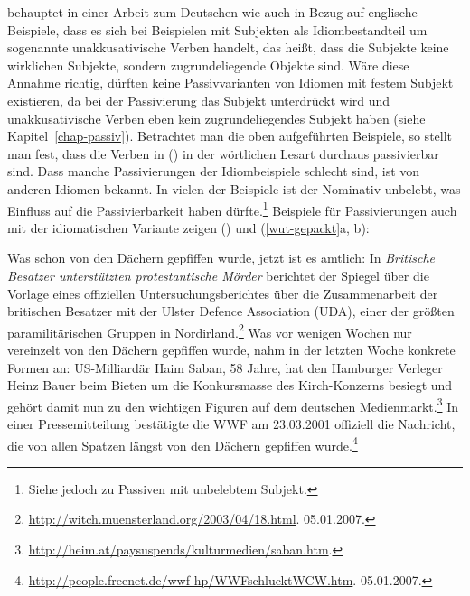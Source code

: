 \citet[]{Scherpenisse86a} behauptet in einer Arbeit zum Deutschen wie auch \citet{Marantz84a}
in Bezug auf englische Beispiele,
dass es sich bei Beispielen mit Subjekten als Idiombestandteil um sogenannte unakkusativische Verben
handelt, das heißt, dass die Subjekte keine wirklichen Subjekte,
sondern zugrundeliegende Objekte sind. 
%
Wäre diese Annahme richtig,
dürften keine Passivvarianten von Idiomen mit festem Subjekt existieren,
da bei der Passivierung das Subjekt unterdrückt wird und unakkusativische
Verben eben kein zugrundeliegendes Subjekt haben (siehe Kapitel~\ref{chap-passiv}).
Betrachtet man die oben aufgeführten Beispiele, so stellt man fest, dass die Verben in
() in der wörtlichen Lesart durchaus passivierbar sind.
Dass manche Passivierungen der Idiombeispiele schlecht sind, ist
von anderen Idiomen bekannt. In vielen der Beispiele ist der Nominativ
unbelebt, was Einfluss auf die Passivierbarkeit haben dürfte.\footnote{
        Siehe jedoch  zu Passiven mit
        unbelebtem Subjekt.%
}
Beispiele für Passivierungen auch mit der idiomatischen Variante zeigen () %
und (\ref{wut-gepackt}a, b):

\eal
\ex Was schon von den Dächern gepfiffen wurde, jetzt ist es amtlich: In \emph{Britische Besatzer unterstützten protestantische Mörder} berichtet der Spiegel über die Vorlage eines offiziellen Untersuchungsberichtes über die Zusammenarbeit der britischen Besatzer mit der Ulster Defence Association (UDA), einer der größten paramilitärischen Gruppen in Nordirland.\footnote{
  \url{http://witch.muensterland.org/2003/04/18.html}. 05.01.2007.
}
\ex Was vor wenigen Wochen nur vereinzelt von den Dächern gepfiffen wurde, nahm in der letzten Woche konkrete Formen an: US-Milliardär Haim Saban, 58 Jahre, hat den Hamburger Verleger Heinz Bauer beim Bieten um die Konkursmasse des Kirch-Konzerns besiegt und gehört damit nun zu den wichtigen Figuren auf dem deutschen Medienmarkt.\footnote{
  \url{http://heim.at/paysuspends/kulturmedien/saban.htm}.
}
\ex In einer Pressemitteilung bestätigte die WWF am 23.03.2001 offiziell die Nachricht, die von allen Spatzen längst von den Dächern gepfiffen wurde.\footnote{
  \url{http://people.freenet.de/wwf-hp/WWFschlucktWCW.htm}. 05.01.2007.
}
\zl

